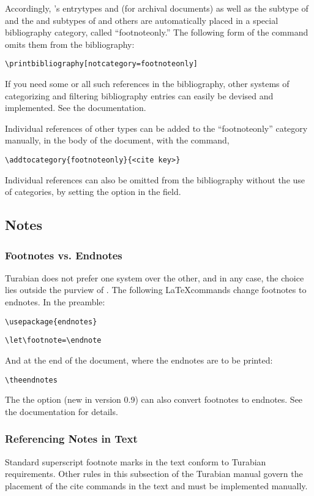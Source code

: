 \documentclass{ltxdockit}[2010/02/12]
\begin{document}
Accordingly, 's entrytypes  and  (for archival documents)  as well as the  subtype of  and the  and  subtypes of  and others are automatically placed in a special bibliography category, called ``footnoteonly.'' 
The following form of the  command omits them from the bibliography:

\verb|\printbibliography[notcategory=footnoteonly]|

If you need some or all such references in the bibliography, other systems of categorizing and filtering bibliography entries can easily be devised and implemented. See the  documentation.

Individual references of other types can be added to the \enquote{footnoteonly}
 category manually, in the body of the document, with the command, 

\verb|\addtocategory{footnoteonly}{<cite key>}|

Individual references can also be omitted from the bibliography without the use of categories, by setting the  option  in the  field.


\subsection{Notes}

\subsubsection{Footnotes vs. Endnotes}

Turabian does not prefer one system over the other, and in any case, the choice lies outside the purview of . The following \LaTeX commands change footnotes to endnotes.
In the preamble:

\verb|\usepackage{endnotes}|

\verb|\let\footnote=\endnote|

\noindent And at the end of the document, where the endnotes are to be printed:

\verb|\theendnotes|

The the  option (new in  version 0.9) can also convert footnotes to endnotes. See the  documentation for details.

\subsubsection{Referencing Notes in Text}
Standard  superscript footnote marks in the text conform to Turabian requirements. Other rules in this subsection of the Turabian manual govern the placement of the cite commands in the text and must be implemented manually.
\end{document}
